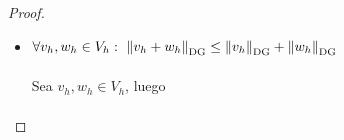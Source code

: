 \documentclass[10pt,a4paper]{report}
\providecommand{\abs}[1]{\left\lvert#1\right\rvert}
\providecommand{\norm}[1]{\left\lVert#1\right\rVert}
\providecommand{\salto}[1]{\left\llbracket#1\right\rrbracket}
\begin{document}
\begin{proof}
\begin{itemize}
            Dado $ \lambda\in \mathbb{R}$ y $\ v_{h}\in V_{h}$, luego
            \begin{align*}
            	\norm{\lambda v_{h}}_{\textup{DG}} = \left( \norm{(\lambda v_{h})'}^{2}_{L^{2}(a,b)} + \sum_{i=0}^{n+1}h^{-1}\abs{\salto{(\lambda v_{h})(x_{i})}}^{2}  \right)^{1/2} = \left( \norm{\lambda v'_{h}}^{2}_{L^{2}(a,b)} + \sum_{i=0}^{n+1}h^{-1}\abs{\salto{\lambda v_{h}(x_{i})}}^{2}  \right)^{1/2}
            \end{align*}
            Notemos que
            \begin{align*}
            	\sum_{i=0}^{n+1}h^{-1}\abs{\salto{\lambda v_{h}(x_{i})}}^{2} &= h^{-1}\abs{\salto{\lambda v_{h}(a)}}^{2} + h^{-1}\abs{\salto{\lambda v_{h}(b)}}^{2} + \sum_{i=1}^{n}h^{-1}\abs{\salto{\lambda v_{h}(x_{i})}}^{2}\\
            	&= h^{-1}\abs{-\lambda v_{h}(a)}^{2} + h^{-1}\abs{\lambda v_{h}(b)}^{2} + \sum_{i=1}^{n}h^{-1}\abs{\lambda v_{h}(x^{-}_{i}) - \lambda v_{h}(x^{+}_{i})}^{2}\\
            	&= \abs{\lambda}^{2}\abs{-v_{h}(a)}^{2} + \abs{\lambda}^{2}h^{-1}\abs{ v_{h}(b)}^{2} + \abs{\lambda}^{2}\sum_{i=1}^{n}h^{-1}\abs{v_{h}(x^{-}_{i}) - v_{h}(x^{+}_{i})}^{2}\\
            	&= \abs{\lambda}^{2}\left( \abs{-v_{h}(a)}^{2} + h^{-1}\abs{ v_{h}(b)}^{2} + \sum_{i=1}^{n}h^{-1}\abs{v_{h}(x^{-}_{i}) - v_{h}(x^{+}_{i})}^{2}\right) \\
            	&= \abs{\lambda}^{2}\sum_{i=0}^{n+1}h^{-1}\abs{\salto{v_{h}(x_{i})}}^{2}
            \end{align*} 
            Usando esto
            \begin{align*}
            	\norm{\lambda v_{h}}_{\textup{DG}} &= \left( \norm{\lambda v'_{h}}^{2}_{L^{2}(a,b)} + \sum_{i=0}^{n+1}h^{-1}\abs{\salto{\lambda v_{h}(x_{i})}}^{2}  \right)^{1/2}\\ &= \left( \abs{\lambda}^{2}\norm{ v'_{h}}^{2}_{L^{2}(a,b)} + \abs{\lambda}^{2}\sum_{i=0}^{n+1}h^{-1}\abs{\salto{ v_{h}(x_{i})}}^{2}  \right)^{1/2}\\ &= \abs{\lambda} \norm{v_{h}}_{\textup{DG}}
            \end{align*}
            \item[$(iii)$] $\forall v_{h},w_{h}\in V_{h}:\ \norm{v_{h} + w_{h}}_{\textup{DG}} \leq \norm{v_{h}}_{\textup{DG}} + \norm{w_{h}}_{\textup{DG}}$\\~\\
            Sea $v_{h},w_{h}\in V_{h}$, luego
            \begin{align*}

\end{align*}
\end{itemize}
\end{proof}
\end{document}
